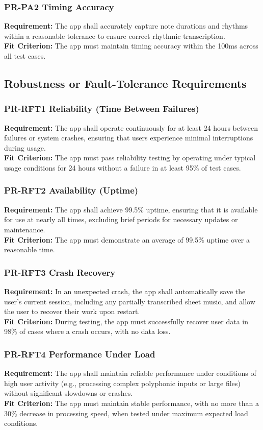 \documentclass[12pt]{article}
\begin{document}
\subsubsection*{PR-PA2 Timing Accuracy}
\textbf{Requirement:} The app shall accurately capture note durations and rhythms within a reasonable tolerance to ensure correct rhythmic transcription.\\
\textbf{Fit Criterion:} The app must maintain timing accuracy within the 100ms across all test cases.

\subsection{Robustness or Fault-Tolerance Requirements}
\subsubsection*{PR-RFT1 Reliability (Time Between Failures)}
\textbf{Requirement:} The app shall operate continuously for at least 24 hours between failures or system crashes, ensuring that users experience minimal interruptions during usage.\\
\textbf{Fit Criterion:} The app must pass reliability testing by operating under typical usage conditions for 24 hours without a failure in at least 95\% of test cases.
\subsubsection*{PR-RFT2 Availability (Uptime)}
\textbf{Requirement:} The app shall achieve 99.5\% uptime, ensuring that it is available for use at nearly all times, excluding brief periods for necessary updates or maintenance.\\
\textbf{Fit Criterion:} The app must demonstrate an average of 99.5\% uptime over a reasonable time.
\subsubsection*{PR-RFT3 Crash Recovery}
\textbf{Requirement:} In an unexpected crash, the app shall automatically save the user’s current session, including any partially transcribed sheet music, and allow the user to recover their work upon restart.\\
\textbf{Fit Criterion:} During testing, the app must successfully recover user data in 98\% of cases where a crash occurs, with no data loss.
\subsubsection*{PR-RFT4 Performance Under Load}
\textbf{Requirement:} The app shall maintain reliable performance under conditions of high user activity (e.g., processing complex polyphonic inputs or large files) without significant slowdowns or crashes.\\
\textbf{Fit Criterion:} The app must maintain stable performance, with no more than a 30\% decrease in processing speed, when tested under maximum expected load conditions.
\end{document}
